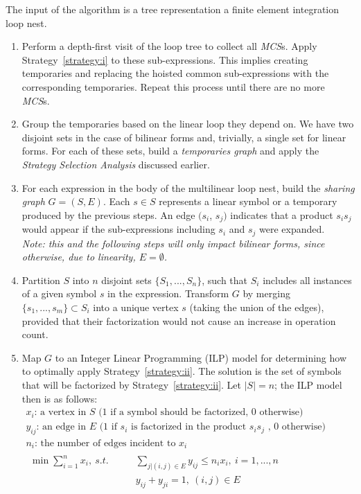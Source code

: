 \begin{Algo}
\label{algo:sharing-elimination}
\normalfont 
The input of the algorithm is a tree representation a finite element integration loop nest.
\begin{enumerate}
\item Perform a depth-first visit of the loop tree to collect all {\em MCS}s. Apply Strategy~\ref{strategy:i} to these sub-expressions. This implies creating temporaries and replacing the hoisted common sub-expressions with the corresponding temporaries. Repeat this process until there are no more {\em MCS}s.

\item Group the temporaries based on the linear loop they depend on. We have two disjoint sets in the case of bilinear forms and, trivially, a single set for linear forms. For each of these sets, build a {\em temporaries graph} and apply the {\em Strategy Selection Analysis} discussed earlier.

\item For each expression in the body of the multilinear loop nest, build the \textit{sharing graph} $G = (S, E)$. Each $s \in S$ represents a linear symbol or a temporary produced by the previous steps. An edge $(s_i$, $s_j)$ indicates that a product $s_i s_j$ would appear if the sub-expressions including $s_i$ and $s_j$ were expanded.\\
\textit{Note: this and the following steps will only impact bilinear forms, since otherwise, due to linearity, $E = \emptyset$.}

\item Partition $S$ into $n$ disjoint sets $\lbrace S_1, ..., S_n\rbrace$, such that $S_i$ includes all instances of a given symbol $s$ in the expression. Transform $G$ by merging $\lbrace s_1, ..., s_m \rbrace \subset S_i$ into a unique vertex $s$ (taking the union of the edges), provided that their factorization would not cause an increase in operation count.

\item Map $G$ to an Integer Linear Programming (ILP) model for determining how to optimally apply Strategy~\ref{strategy:ii}. The solution is the set of symbols that will be factorized by Strategy~\ref{strategy:ii}. Let $|S| = n$; the ILP model then is as follows:
\begin{gather*}
x_i \text{: a vertex in } S \text{ (1 if a symbol should be factorized, 0 otherwise)}\\
y_{ij} \text{: an edge in } E \text{ (1 if } s_i \text{ is factorized in the product } s_i s_j \text{ , 0 otherwise)}\\
n_i \text{: the number of edges incident to } x_i \\
\begin{align*}
\min \sum_{i=1}^{n} x_i,\ s.t. ~~~~~~~~~&\sum_{j|(i,j) \in E} y_{ij} \leq n_i x_i,\ i = 1, ..., n \\
& y_{ij} + y_{ji} = 1,\ (i, j) \in E
\end{align*}
\phantom{\hspace{6cm}}
\end{gather*}



\end{enumerate}
\end{Algo}
